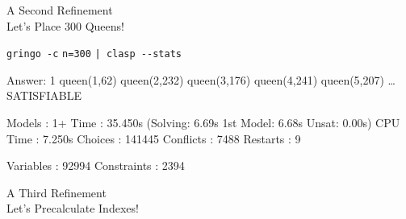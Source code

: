 \begin{frame}[fragile]{A Second Refinement\\
              \normalsize Let's Place \alert{$300$} Queens!}
\begin{block}{\alert<1>{\lstinline{gringo -c} \alert{\lstinline{n=300}}  \lstinline{| clasp --stats}}}
\vspace*{-3mm}
\pause\footnotesize%
\begin{semiverbatim}
Answer: 1
queen(1,62) queen(2,232) queen(3,176) queen(4,241) queen(5,207) \dots{}
SATISFIABLE

Models      : 1+
\alert<2-3>{Time        : 35.450s} (\alert<3>{Solving: 6.69s} 1st Model: 6.68s Unsat: 0.00s)
CPU Time    : 7.250s
Choices     : 141445
\alert<2>{Conflicts   : 7488}
Restarts    : 9

\alert<2>{Variables   : 92994}
\alert<2>{Constraints : 2394}
\end{semiverbatim}
\end{block}
\end{frame}
\begin{frame}[fragile]{A Third Refinement\\
                       \normalsize Let's Precalculate Indexes!}
\begin{block}{}



\end{block}
\end{frame}

